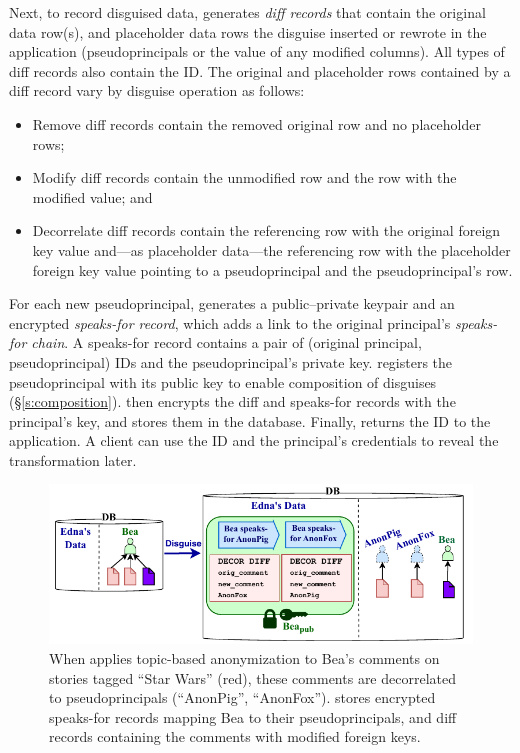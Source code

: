 %
Next, to record disguised data, \sys generates \emph{diff records} that contain \one{}
the original data row(s), and \two{} placeholder data rows the disguise inserted
or rewrote in the application (\eg pseudoprincipals or the value of any modified
columns).
%
All types of diff records also contain the \xx ID. 
%
The original and placeholder rows contained by a diff record vary by disguise
operation as follows:
\begin{itemize}[nosep]
    \item Remove diff records contain the removed original row and no
        placeholder rows;
    \item Modify diff records contain the unmodified row and the
        row with the modified value; and
    \item Decorrelate diff records contain the referencing row with the original
        foreign key value and---as placeholder data---the referencing row with the placeholder
        foreign key value pointing to a pseudoprincipal and the pseudoprincipal's row.
\end{itemize}
%
For each new pseudoprincipal, \sys generates a public--private keypair and 
an encrypted \emph{speaks-for record}, which adds a link to the original principal's
\emph{speaks-for chain}.
A speaks-for record contains a pair of (original principal,
pseudoprincipal) IDs and the pseudoprincipal’s
private key. \sys registers the pseudoprincipal with its public key to enable
composition of disguises (\S\ref{s:composition}).
%
\sys then encrypts the diff and speaks-for records with the principal's key,
and stores them in the database.
%
%
%
Finally, \sys returns the \xx ID to the application.
%
A client can use the \xx ID and the principal's
credentials to reveal the transformation later.
%

\begin{figure}[!t]
\centering
\includegraphics{figs/lobsters_catanon_visual}
    \caption[Topic-based anonymization creates pseudoprincipals and
    disguise records.]{When \sys applies topic-based anonymization to Bea's comments on
    stories tagged ``Star Wars'' (red), these comments are decorrelated to
    pseudoprincipals (``AnonPig'', ``AnonFox''). \sys stores encrypted
    speaks-for records mapping Bea to their
    pseudoprincipals, and diff records containing the comments with
    modified foreign keys.}
\label{f:lobsters_visual}
\end{figure}


